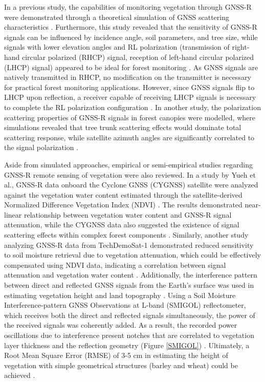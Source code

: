 \documentclass[12pt, a4paper]{article}
\begin{document}
In a previous study, the capabilities of monitoring vegetation through GNSS-R
were demonstrated through a theoretical simulation of GNSS scattering
characteristics \cite{Ferrazzoli2011}. Furthermore, this study revealed that the
sensitivity of GNSS-R signals can be influenced by incidence angle, soil
parameters, and tree size, while signals with lower elevation angles and RL
polarization (transmission of right-hand circular polarized (RHCP) signal,
reception of left-hand circular polarized (LHCP) signal) appeared to be ideal
for forest monitoring \cite{Ferrazzoli2011}. As GNSS signals are natively
transmitted in RHCP, no modification on the transmitter is necessary for
practical forest monitoring applications. However, since GNSS signals flip to
LHCP upon reflection, a receiver capable of receiving LHCP signals is necessary
to complete the RL polarization configuration \cite{Jia2018}. In another study,
the polarization scattering properties of GNSS-R signals in forest canopies were
modelled, where simulations revealed that tree trunk scattering effects would
dominate total scattering response, while satellite azimuth angles are
significantly correlated to the signal polarization \cite{Wu2014}. 

Aside from simulated approaches, empirical or semi-empirical studies regarding
GNSS-R remote sensing of vegetation were also reviewed. In a study by Yueh et
al., GNSS-R data onboard the Cyclone GNSS (CYGNSS) satellite were analyzed
against the vegetation water content estimated through the satellite-derived
Normalized Difference Vegetation Index (NDVI) \cite{Yueh2022}. The results
demonstrated near-linear relationship between vegetation water content and
GNSS-R signal attenuation, while the CYGNSS data also suggested the existence of
signal scattering effects within complex forest components \cite{Yueh2022}.
Similarly, another study analyzing GNSS-R data from TechDemoSat-1 demonstrated
reduced sensitivity to soil moisture retrieval due to vegetation attenuation,
which could be effectively compensated using NDVI data, indicating a correlation
between signal attenuation and vegetation water content \cite{Camps2016}.
Additionally, the interference pattern between direct and reflected GNSS signals
from the Earth's surface was used in estimating vegetation height and land
topography \cite{RodriguezAlvarez2011}. Using a Soil Moisture
Interference-pattern GNSS Observations at L-band (SMIGOL) reflectometer, which
receives both the direct and reflected signals simultaneously, the power of the
received signals was coherently added. As a result, the recorded power
oscillations due to interference present notches that are correlated to
vegetation layer thickness and the reflection geometry (Figure \ref{SMIGOL})
\cite{RodriguezAlvarez2011}. Ultimately, a Root Mean Square Error (RMSE) of 3-5
cm in estimating the height of vegetation with simple geometrical structures
(barley and wheat) could be achieved \cite{RodriguezAlvarez2011}.
\end{document}
